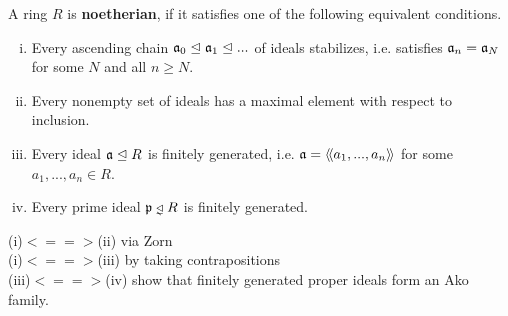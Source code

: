 	\begin{definition}
		A ring $R$ is \textbf{noetherian}, if it satisfies one of the following equivalent conditions.
		\begin{enumerate}[(i)]
			\item{
				Every ascending chain $\mathfrak{a}_0 \trianglelefteq \mathfrak{a}_1 \trianglelefteq ...$ of ideals stabilizes, i.e. satisfies $\mathfrak{a}_n = \mathfrak{a}_N$ for some $N$ and all $n \geq N$.
			}
			\item{
				Every nonempty set of ideals has a maximal element with respect to inclusion.
			}
			\item{
				Every ideal $\mathfrak{a} \trianglelefteq R$ is finitely generated, i.e. $\mathfrak{a} = \langle\!\langle a_1,...,a_n \rangle\!\rangle$ for some $a_1,...,a_n \in R$.
			}
			\item{
				Every prime ideal $\ideal{p} \divneq R$ is finitely generated.
			}
		\end{enumerate}
	\end{definition}
	\begin{sketch}
		(i)$<==>$(ii) via Zorn\\
		(i)$<==>$(iii) by taking contrapositions\\
		(iii)$<==>$(iv) show that finitely generated proper ideals form an Ako family.
	\end{sketch}

